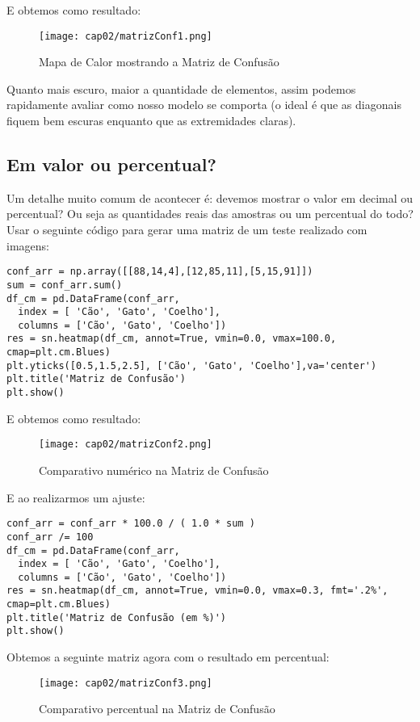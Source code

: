 E obtemos como resultado:
\begin{figure}[H]
	\centering
	\texttt{[image: cap02/matrizConf1.png]}
	\caption{Mapa de Calor mostrando a Matriz de Confusão}
\end{figure}

Quanto mais escuro, maior a quantidade de elementos, assim podemos rapidamente avaliar como nosso modelo se comporta (o ideal é que as diagonais fiquem bem escuras enquanto que as extremidades claras).

\subsection{Em valor ou percentual?}
Um detalhe muito comum de acontecer é: devemos mostrar o valor em decimal ou percentual? Ou seja as quantidades reais das amostras ou um percentual do todo? Usar o seguinte código para gerar uma matriz de um teste realizado com imagens:
\begin{lstlisting}[]
conf_arr = np.array([[88,14,4],[12,85,11],[5,15,91]])
sum = conf_arr.sum()
df_cm = pd.DataFrame(conf_arr,
  index = [ 'Cão', 'Gato', 'Coelho'],
  columns = ['Cão', 'Gato', 'Coelho'])
res = sn.heatmap(df_cm, annot=True, vmin=0.0, vmax=100.0, cmap=plt.cm.Blues)
plt.yticks([0.5,1.5,2.5], ['Cão', 'Gato', 'Coelho'],va='center')
plt.title('Matriz de Confusão')
plt.show()
\end{lstlisting}

E obtemos como resultado:
\begin{figure}[H]
	\centering
	\texttt{[image: cap02/matrizConf2.png]}
	\caption{Comparativo numérico na Matriz de Confusão}
\end{figure}

E ao realizarmos um ajuste:
\begin{lstlisting}[]
conf_arr = conf_arr * 100.0 / ( 1.0 * sum )
conf_arr /= 100
df_cm = pd.DataFrame(conf_arr,
  index = [ 'Cão', 'Gato', 'Coelho'],
  columns = ['Cão', 'Gato', 'Coelho'])
res = sn.heatmap(df_cm, annot=True, vmin=0.0, vmax=0.3, fmt='.2%', cmap=plt.cm.Blues)
plt.title('Matriz de Confusão (em %)')
plt.show()
\end{lstlisting}

Obtemos a seguinte matriz agora com o resultado em percentual:
\begin{figure}[H]
	\centering
	\texttt{[image: cap02/matrizConf3.png]}
	\caption{Comparativo percentual na Matriz de Confusão}
\end{figure}


